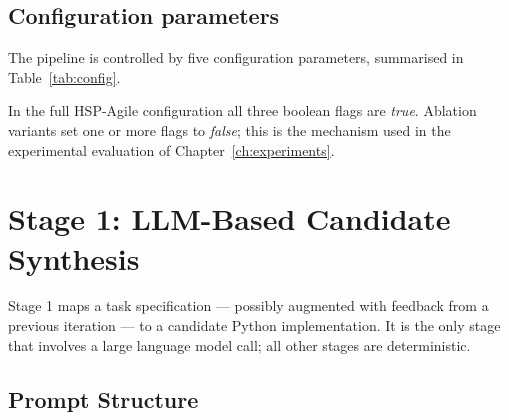 \subsection*{Configuration parameters}

The pipeline is controlled by five configuration parameters, summarised in
Table~\ref{tab:config}.

\begin{table}[t]
  \caption{HSP-Agile pipeline configuration parameters.}
  \label{tab:config}
  \centering
\end{table}

In the full HSP-Agile configuration all three boolean flags are \textit{true}.
Ablation variants set one or more flags to \textit{false}; this is the
mechanism used in the experimental evaluation of
Chapter~\ref{ch:experiments}.

\section{Stage 1: LLM-Based Candidate Synthesis}
\label{sec:method:synthesis}

Stage 1 maps a task specification — possibly augmented with feedback from a
previous iteration — to a candidate Python implementation.  It is the only
stage that involves a large language model call; all other stages are
deterministic.

\subsection{Prompt Structure}
\label{subsec:method:prompt}

